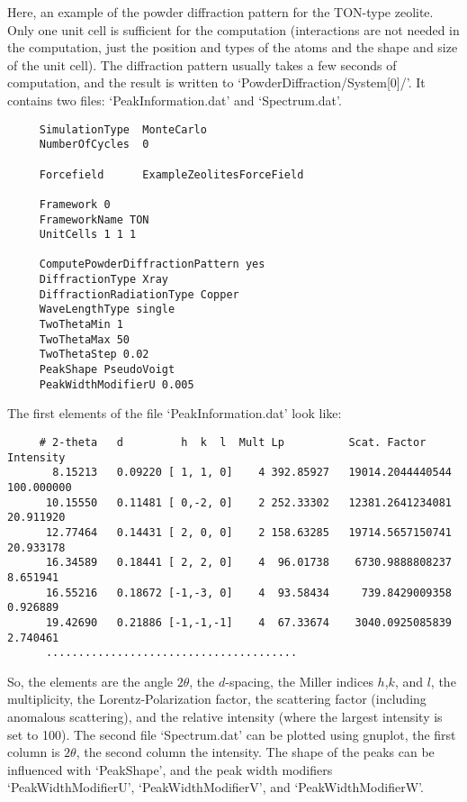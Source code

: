 Here, an example of the powder diffraction pattern for the TON-type zeolite. Only one unit cell is sufficient for the computation
(interactions are not needed in the computation, just the position and types of the atoms and the shape and size of the unit cell).
The diffraction pattern usually takes a few seconds of computation, and the result is written to `PowderDiffraction/System[0]/'. It contains
two files: `PeakInformation.dat' and `Spectrum.dat'.
\begin{tiny}
\begin{verbatim}
     SimulationType  MonteCarlo
     NumberOfCycles  0

     Forcefield      ExampleZeolitesForceField

     Framework 0
     FrameworkName TON
     UnitCells 1 1 1

     ComputePowderDiffractionPattern yes
     DiffractionType Xray
     DiffractionRadiationType Copper
     WaveLengthType single
     TwoThetaMin 1
     TwoThetaMax 50
     TwoThetaStep 0.02
     PeakShape PseudoVoigt
     PeakWidthModifierU 0.005
\end{verbatim}
\end{tiny}

The first elements of the file `PeakInformation.dat' look like:
\begin{tiny}
\begin{verbatim}
     # 2-theta   d         h  k  l  Mult Lp          Scat. Factor    Intensity
       8.15213   0.09220 [ 1, 1, 0]    4 392.85927   19014.2044440544   100.000000
      10.15550   0.11481 [ 0,-2, 0]    2 252.33302   12381.2641234081    20.911920
      12.77464   0.14431 [ 2, 0, 0]    2 158.63285   19714.5657150741    20.933178
      16.34589   0.18441 [ 2, 2, 0]    4  96.01738    6730.9888808237     8.651941
      16.55216   0.18672 [-1,-3, 0]    4  93.58434     739.8429009358     0.926889
      19.42690   0.21886 [-1,-1,-1]    4  67.33674    3040.0925085839     2.740461
      .......................................
\end{verbatim}
\end{tiny}
So, the elements are the angle $2\theta$, the $d$-spacing, the Miller indices $h$,$k$, and $l$, the multiplicity,
the Lorentz-Polarization factor, the scattering factor (including anomalous scattering), and the relative intensity (where
the largest intensity is set to 100).
The second file `Spectrum.dat' can be plotted using gnuplot, the first column is $2\theta$, the second column the intensity.
The shape of the peaks can be influenced with `PeakShape', and the peak width modifiers `PeakWidthModifierU',
`PeakWidthModifierV', and `PeakWidthModifierW'.

